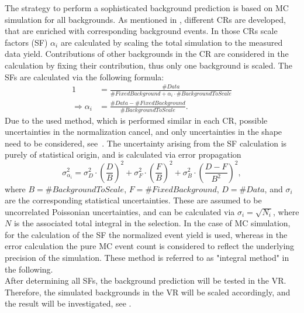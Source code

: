 The strategy to perform a sophisticated background prediction is based on MC simulation for all backgrounds. As mentioned in , different CRs are developed, that are enriched with corresponding background events. In those CRs scale factors (SF) $\alpha_i$ are calculated by scaling the total simulation to the measured data yield. Contributions of other backgrounds in the CR are considered in the calculation by fixing their contribution, thus only one background is scaled. The SFs are calculated via the following formula:
\begin{align}
 1                        & = \frac{\#Data}{\#FixedBackground+\alpha_i\cdot\#BackgroundToScale} \\
 \Longrightarrow \alpha_i & = \frac{\#Data-\#FixedBackground}{\#BackgroundToScale}.             
\end{align}
Due to the used method, which is performed similar in each CR, possible uncertainties in the normalization cancel, and only uncertainties in the shape need to be considered, see~. The uncertainty arising from the SF calculation is purely of statistical origin, and is calculated via error propagation
\begin{equation}
 \sigma_{\alpha_i}^2 = \sigma_{D}^2 \cdot \left(\frac{D}{B}\right)^2 + \sigma_{F}^2 \cdot \left(\frac{F}{B}\right)^2 + \sigma_{B}^2 \cdot \left(\frac{D-F}{B^2}\right)^2,
\end{equation}
where $B=\#BackgroundToScale$, $F=\#FixedBackground$, $D=\#Data$, and $\sigma_i$ are the corresponding statistical uncertainties. These are assumed to be uncorrelated Poissonian uncertainties, and can be calculated via $\sigma_i=\sqrt{N_i}$, where $N$ is the associated total integral in the selection. In the case of MC simulation, for the calculation of the SF the normalized event yield is used, whereas in the error calculation the pure MC event count is considered to reflect the underlying precision of the simulation. These method is referred to as "integral method" in the following.\\
After determining all SFs, the background prediction will be tested in the VR. Therefore, the simulated backgrounds in the VR will be scaled accordingly, and the result will be investigated, see .



